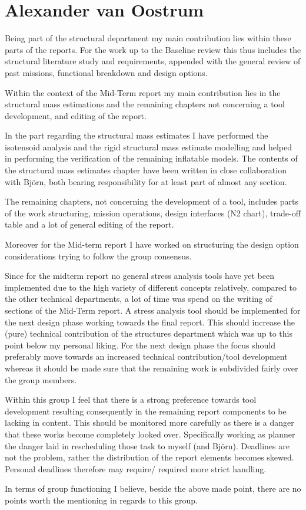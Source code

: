 \section{Alexander van Oostrum}

Being part of the structural department my main contribution lies within these parts of the reports. For the work up to the Baseline review this thus includes the structural literature study and requirements, appended with the general review of past missions, functional breakdown and design options. 

Within the context of the Mid-Term report my main contribution lies in the structural mass estimations and the remaining chapters not concerning a tool development, and editing of the report.

In the part regarding the structural mass estimates I have performed the isotensoid analysis and the rigid structural mass estimate modelling and helped in performing the verification of the remaining inflatable models.  The contents of the structural mass estimates chapter have been written in close collaboration with Bj\"{o}rn, both bearing responsibility for at least part of almost any section.

The remaining chapters, not concerning the development of a tool, includes parts of the work structuring, mission operations, design interfaces (N2 chart), trade-off table and a lot of general editing of the report.

Moreover for the Mid-term report I have worked on structuring the design option considerations trying to follow the group consensus.

Since for the midterm report no general stress analysis tools have yet been implemented due to the high variety of different concepts relatively, compared to the other technical departments, a lot of time was spend on the writing of sections of the Mid-Term report.  A stress analysis tool should be implemented for the next design phase working towards the final report. This should increase the (pure) technical contribution of the structures department which was up to this point below my personal liking. For the next design phase the focus should preferably move towards an increased technical contribution/tool development whereas it should be made sure that the remaining work is subdivided fairly over the group members.

Within this group I feel that there is a strong preference towards tool development resulting consequently in the remaining report components to be lacking in content. This should be monitored more carefully as there is a danger that these works become completely looked over. Specifically working as planner the danger laid in rescheduling those task to myself (and Bj\"{o}rn). Deadlines are not the problem, rather the distribution of the report elements becomes skewed. Personal deadlines therefore may require/ required more strict handling. 

In terms of group functioning I believe, beside the above made point, there are no points worth the mentioning in regards to this group. 
 
